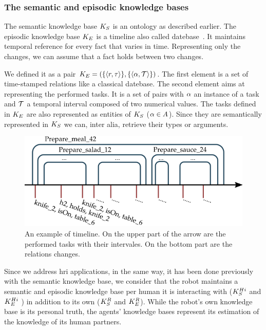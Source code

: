 \subsubsection{The semantic and episodic knowledge bases}

The semantic knowledge base $K_S$ is an ontology as described earlier. The episodic knowledge base $K_E$ is a timeline also called datebase~\cite{allen_1983_maintaining}. It maintains temporal reference for every fact that varies in time. Representing only the changes, we can assume that a fact holds between two changes.

We defined it as a pair $K_E = ( \{ \langle r, \tau \rangle \}, \{ \langle \alpha, \mathcal{T} \rangle \} )$. The first element is a set of time-stamped relations like a classical datebase. The second element aims at representing the performed tasks. It is a set of pairs with $\alpha$ an instance of a task and $\mathcal{T}$ a temporal interval composed of two numerical values. The tasks defined in $K_E$ are also represented as entities of $K_S$ ($\alpha \in A$). Since they are semantically represented in $K_S$ we can, inter alia, retrieve their types or arguments.

\begin{figure}[h!]
\centering
\includegraphics[scale=0.55]{figures/chapter6/ke.png}
\caption{\label{fig:chap6_ke} An example of timeline. On the upper part of the arrow are the performed tasks with their intervales. On the bottom part are the relations changes.}
\end{figure}

Since we address \acrshort{hri} applications, in the same way, it has been done previously with the semantic knowledge base, we consider that the robot maintains a semantic and episodic knowledge base per human it is interacting with ($K_S^{Hi}$ and $K_E^{Hi}$ ) in addition to its own ($K_S^{R}$ and $K_E^{R}$). While the robot's own knowledge base is its personal truth, the agents' knowledge bases represent its estimation of the knowledge of its human partners.

